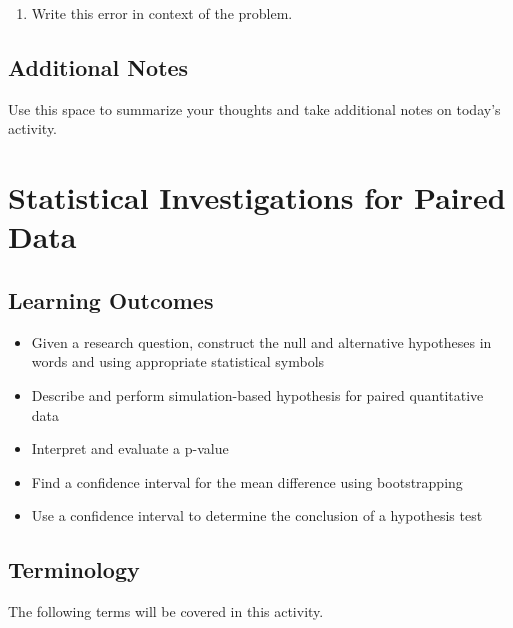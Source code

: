 \documentclass[
]{report}
\providecommand{\tightlist}{%
  \setlength{\itemsep}{0pt}\setlength{\parskip}{0pt}}
\begin{document}
\begin{enumerate}
\def\labelenumi{\arabic{enumi}.}
\setcounter{enumi}{27}
\tightlist
\item
  Write this error in context of the problem.
\end{enumerate}

\vspace{1in}

\hypertarget{additional-notes}{%
\section{Additional Notes}\label{additional-notes}}

Use this space to summarize your thoughts and take additional notes on today's activity.

\hypertarget{statistical-investigations-for-paired-data}{%
\chapter{Statistical Investigations for Paired Data}\label{statistical-investigations-for-paired-data}}

\hypertarget{learning-outcomes}{%
\section{Learning Outcomes}\label{learning-outcomes}}

\begin{itemize}
\item
  Given a research question, construct the null and alternative hypotheses
  in words and using appropriate statistical symbols
\item
  Describe and perform simulation-based hypothesis for paired quantitative data
\item
  Interpret and evaluate a p-value
\item
  Find a confidence interval for the mean difference using bootstrapping
\item
  Use a confidence interval to determine the conclusion of a hypothesis test
\end{itemize}

\hypertarget{terminology}{%
\section{Terminology}\label{terminology}}

The following terms will be covered in this activity.
\end{document}
